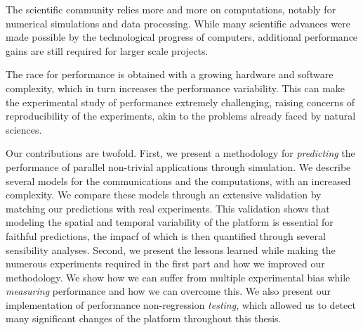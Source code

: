The scientific community relies more and more on computations, notably for numerical simulations and data processing.
While many scientific advances were made possible by the technological progress of computers, additional performance
gains are still required for larger scale projects.

The race for performance is obtained with a growing hardware and software complexity, which in turn increases the
performance variability. This can make the experimental study of performance extremely challenging, raising concerns of
reproducibility of the experiments, akin to the problems already faced by natural sciences.

Our contributions are twofold. First, we present a methodology for \emph{predicting} the performance of parallel
non-trivial applications through simulation. We describe several models for the communications and the computations,
with an increased complexity. We compare these models through an extensive validation by matching our predictions with
real experiments. This validation shows that modeling the spatial and temporal variability of the platform is essential
for faithful predictions, the impacf of which is then quantified through several sensibility analyses.  Second, we
present the lessons learned while making the numerous experiments required in the first part and how we improved our
methodology. We show how we can suffer from multiple experimental bias while \emph{measuring} performance and how we can
overcome this. We also present our implementation of performance non-regression \emph{testing}, which allowed us to
detect many significant changes of the platform throughout this thesis.
